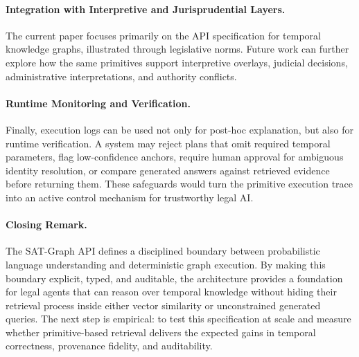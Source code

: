 \documentclass[11pt]{article}
\begin{document}
\paragraph{Integration with Interpretive and Jurisprudential Layers.}
The current paper focuses primarily on the API specification for temporal knowledge graphs, illustrated through legislative norms. Future work can further explore how the same primitives support interpretive overlays, judicial decisions, administrative interpretations, and authority conflicts. 

\paragraph{Runtime Monitoring and Verification.}
Finally, execution logs can be used not only for post-hoc explanation, but also for runtime verification. A system may reject plans that omit required temporal parameters, flag low-confidence anchors, require human approval for ambiguous identity resolution, or compare generated answers against retrieved evidence before returning them. These safeguards would turn the primitive execution trace into an active control mechanism for trustworthy legal AI.

\paragraph{Closing Remark.}
The SAT-Graph API defines a disciplined boundary between probabilistic language understanding and deterministic graph execution. By making this boundary explicit, typed, and auditable, the architecture provides a foundation for legal agents that can reason over temporal knowledge without hiding their retrieval process inside either vector similarity or unconstrained generated queries. The next step is empirical: to test this specification at scale and measure whether primitive-based retrieval delivers the expected gains in temporal correctness, provenance fidelity, and auditability.




\end{document}
